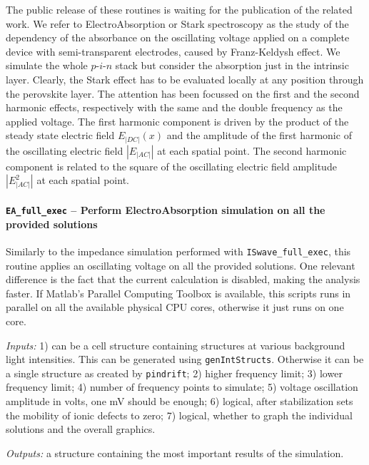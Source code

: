 The public release of these routines is waiting for the publication of the related work.
We refer to ElectroAbsorption or Stark spectroscopy as the study of the dependency of the absorbance on the oscillating voltage applied on a complete device with semi\hyp{}transparent electrodes, caused by Franz\hyp{}Keldysh effect.
We simulate the whole $p$-$i$-$n$ stack but consider the absorption just in the intrinsic layer.
Clearly, the Stark effect has to be evaluated locally at any position through the perovskite layer.
The attention has been focussed on the first and the second harmonic effects, respectively with the same and the double frequency as the applied voltage.
The first harmonic component is driven by the product of the steady state electric field $E_|DC|(x)$ and the amplitude of the first harmonic of the oscillating electric field $|E_|AC||$ at each spatial point.
The second harmonic component is related to the square of the oscillating electric field amplitude $|E_|AC|^2|$ at each spatial point.



\paragraph{\texttt{EA\_full\_exec} -- Perform ElectroAbsorption simulation on all the provided solutions}
Similarly to the impedance simulation performed with \texttt{ISwave\_full\_exec}, this routine applies an oscillating voltage on all the provided solutions.
One relevant difference is the fact that the current calculation is disabled, making the analysis faster.
If Matlab's Parallel Computing Toolbox is available, this scripts runs in parallel on all the available physical CPU cores, otherwise it just runs on one core.

\textit{Inputs:} 1) can be a cell structure containing structures at various background
light intensities. This can be generated using \texttt{gen\-Int\-Structs}.
Otherwise it can be a single structure as created by \texttt{pindrift};
2) higher frequency limit;
3) lower frequency limit;
4) number of frequency points to simulate;
5) voltage oscillation amplitude in volts, one mV should be enough;
6) logical, after stabilization sets the mobility of
ionic defects to zero;
7) logical, whether to graph the individual solutions and
the overall graphics.

\textit{Outputs:} a structure containing the most important results of the simulation.

